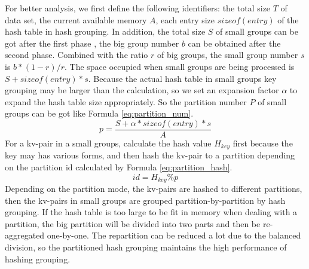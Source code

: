 For better analysis, we first define the following identifiers: the total size $T$ of data set, the current available memory $A$, each entry size $sizeof(entry)$ of the hash table in hash grouping. In addition, the total size $S$ of small groups can be got after the first phase , the big group number $b$ can be obtained after the second phase. Combined with the ratio $r$ of big groups, the small group number $s$ is $b*(1-r)/r$. The space occupied when small groups are being processed is $S + sizeof(entry)*s$. Because the actual hash table in small groups key grouping may be larger than the calculation, so we set an expansion factor $\alpha$ to expand the hash table size appropriately. So the partition number $P$ of small groups can be got like Formula \ref{eq:partition_num}.
\begin{equation}\label{eq:partition_num}
    p = \dfrac{S + \alpha*sizeof(entry)*s}{A}
\end{equation}
For a kv-pair in a small groups, calculate the hash value $H_{key}$ first because the key may has various forms, and then hash the kv-pair to a partition depending on the partition id calculated by Formula \ref{eq:partition_hash}.
\begin{equation}\label{eq:partition_hash}
    id = H_{key} \%  p
\end{equation}
Depending on the partition mode, the kv-pairs are hashed to different partitions, then the kv-pairs in small groups are grouped partition-by-partition by hash grouping. If the hash table is too large to be fit in memory when dealing with a partition, the big partition will be divided into two parts and then be re-aggregated one-by-one. The repartition can be reduced a lot due to the balanced division, so the partitioned hash grouping maintains the high performance of hashing grouping.
